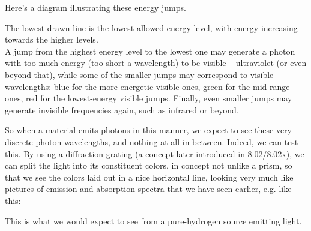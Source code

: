 Here's a diagram illustrating these energy jumps.

\begin{figure}[H]
  \centering
{}
\end{figure}

The lowest-drawn line is the lowest allowed energy level, with energy increasing towards the higher levels.\\
A jump from the highest energy level to the lowest one may generate a photon with too much energy (too short a wavelength) to be visible -- ultraviolet (or even beyond that), while some of the smaller jumps may correspond to visible wavelengths: blue for the more energetic visible ones, green for the mid-range ones, red for the lowest-energy visible jumps. Finally, even smaller jumps may generate invisible frequencies again, such as infrared or beyond.

So when a material emits photons in this manner, we expect to see these very discrete photon wavelengths, and nothing at all in between. Indeed, we can test this. By using a diffraction grating (a concept later introduced in 8.02/8.02x), we can split the light into its constituent colors, in concept not unlike a prism, so that we see the colors laid out in a nice horizontal line, looking very much like pictures of emission and absorption spectra that we have seen earlier, e.g. like this:


This is what we would expect to see from a pure-hydrogen source emitting light.

